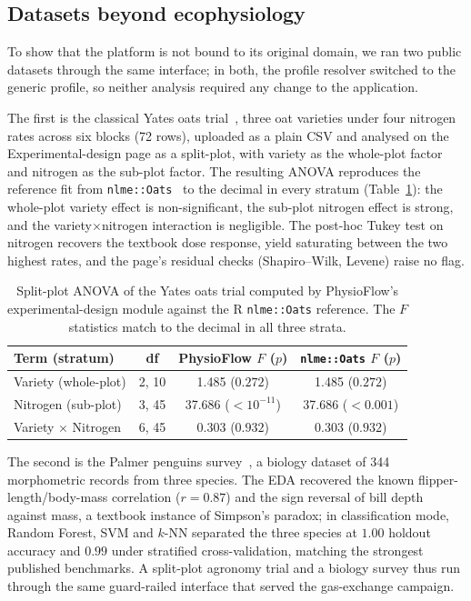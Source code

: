 \documentclass[11pt, letterpaper]{article}
\begin{document}
\subsection{Datasets beyond ecophysiology}\label{sec:ex-generic}

To show that the platform is not bound to its original domain, we ran two public datasets through the same interface; in both, the profile resolver switched to the generic profile, so neither analysis required any change to the application.

The first is the classical Yates oats trial~\cite{Yates1935}, three oat varieties under four nitrogen rates across six blocks (72 rows), uploaded as a plain CSV and analysed on the Experimental-design page as a split-plot, with variety as the whole-plot factor and nitrogen as the sub-plot factor. The resulting ANOVA reproduces the reference fit from \texttt{nlme::Oats}~\cite{Pinheiro2000} to the decimal in every stratum (Table~\ref{tbl:oats}): the whole-plot variety effect is non-significant, the sub-plot nitrogen effect is strong, and the variety$\times$nitrogen interaction is negligible. The post-hoc Tukey test on nitrogen recovers the textbook dose response, yield saturating between the two highest rates, and the page's residual checks (Shapiro--Wilk, Levene) raise no flag.

\begin{table}[htbp]
\centering
\footnotesize
\begin{tabular}{lccc}
\toprule
\textbf{Term (stratum)} & \textbf{df} & \textbf{PhysioFlow $F$ ($p$)} & \textbf{\texttt{nlme::Oats} $F$ ($p$)} \\
\midrule
Variety (whole-plot)      & 2, 10 & 1.485 ($0.272$)        & 1.485 ($0.272$) \\
Nitrogen (sub-plot)       & 3, 45 & 37.686 ($<10^{-11}$)   & 37.686 ($<0.001$) \\
Variety $\times$ Nitrogen & 6, 45 & 0.303 ($0.932$)        & 0.303 ($0.932$) \\
\bottomrule
\end{tabular}
\caption{Split-plot ANOVA of the Yates oats trial computed by PhysioFlow's experimental-design module against the R \texttt{nlme::Oats} reference. The $F$ statistics match to the decimal in all three strata.}\label{tbl:oats}
\end{table}

The second is the Palmer penguins survey~\cite{Gorman2014}, a biology dataset of 344 morphometric records from three species. The EDA recovered the known flipper-length/body-mass correlation ($r=0.87$) and the sign reversal of bill depth against mass, a textbook instance of Simpson's paradox; in classification mode, Random Forest, SVM and $k$-NN separated the three species at $1.00$ holdout accuracy and $0.99$ under stratified cross-validation, matching the strongest published benchmarks. A split-plot agronomy trial and a biology survey thus run through the same guard-railed interface that served the gas-exchange campaign.
\end{document}
